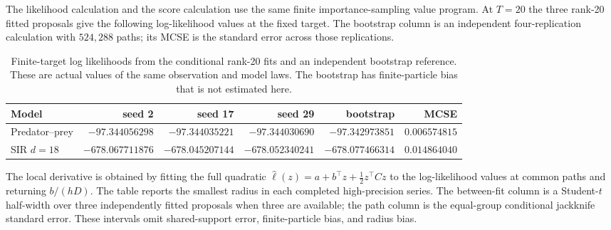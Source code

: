 The likelihood calculation and the score calculation use the same finite
importance-sampling value program.  At $T=20$ the three rank-20 fitted
proposals give the following log-likelihood values at the fixed target.  The
bootstrap column is an independent four-replication calculation with
$524{,}288$ paths; its MCSE is the standard error across those replications.

\begin{table}[htbp]
\centering
\scriptsize
\begin{tabular}{lrrrrr}
\toprule
Model & seed 2 & seed 17 & seed 29 & bootstrap & MCSE\\
\midrule
Predator--prey & $-97.344056298$ & $-97.344035221$ & $-97.344030690$ & $-97.342973851$ & $0.006574815$\\
SIR $d=18$ & $-678.067711876$ & $-678.045207144$ & $-678.052340241$ & $-678.077466314$ & $0.014864040$\\
\bottomrule
\end{tabular}
\caption{Finite-target log likelihoods from the conditional rank-20 fits and
an independent bootstrap reference.  These are actual values of the same
observation and model laws.  The bootstrap has finite-particle bias that is
not estimated here.}
\label{tab:bf-hd-final-likelihood-values}
\end{table}

The local derivative is obtained by fitting the full quadratic
$\widehat\ell(z)=a+b^\top z+\frac12z^\top C z$ to the log-likelihood values
at common paths and returning $b/(hD)$.  The table reports the smallest
radius in each completed high-precision series.  The between-fit column is a
Student-$t$ half-width over three independently fitted proposals when three
are available; the path column is the equal-group conditional jackknife
standard error.  These intervals omit shared-support error, finite-particle
bias, and radius bias.

